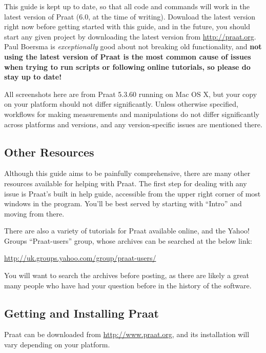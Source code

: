 \documentclass[11pt]{article}
\begin{document}
This guide is kept up to date, so that all code and commands will work
in the latest version of Praat (6.0, at the time of writing). Download
the latest version right now before getting started with this guide, and
in the future, you should start any given project by downloading the
latest version from \url{http://praat.org}. Paul Boersma is
\emph{exceptionally} good about not breaking old functionality, and
\textbf{not using the latest version of Praat is the most common cause
of issues when trying to run scripts or following online tutorials, so
please do stay up to date!}

All screenshots here are from Praat 5.3.60 running on Mac OS X, but your
copy on your platform should not differ significantly. Unless otherwise
specified, workflows for making measurements and manipulations do not
differ significantly across platforms and versions, and any
version-specific issues are mentioned there.

\hypertarget{other-resources}{%
\subsection{Other Resources}\label{other-resources}}

\label{sec:otherresources}

Although this guide aims to be painfully comprehensive, there are many
other resources available for helping with Praat. The first step for
dealing with any issue is Praat's built in help guide, accessible from
the upper right corner of most windows in the program. You'll be best
served by starting with ``Intro'' and moving from there.

There are also a variety of tutorials for Praat available online, and
the Yahoo! Groups ``Praat-users'' group, whose archives can be searched
at the below link:

\url{http://uk.groups.yahoo.com/group/praat-users/}

You will want to search the archives before posting, as there are likely
a great many people who have had your question before in the history of
the software.

\hypertarget{getting-and-installing-praat}{%
\subsection{Getting and Installing
Praat}\label{getting-and-installing-praat}}

Praat can be downloaded from \url{http://www.praat.org}, and its
installation will vary depending on your platform.
\end{document}
